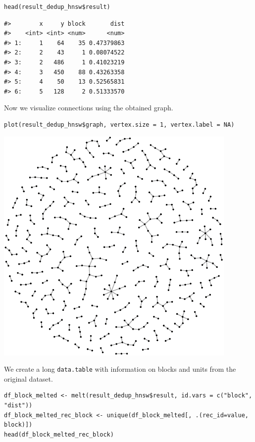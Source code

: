 \begin{verbatim}
head(result_dedup_hnsw$result)
\end{verbatim}

\begin{verbatim}
#>        x     y block       dist
#>    <int> <int> <num>      <num>
#> 1:     1    64    35 0.47379863
#> 2:     2    43     1 0.08074522
#> 3:     2   486     1 0.41023219
#> 4:     3   450    88 0.43263358
#> 5:     4    50    13 0.52565831
#> 6:     5   128     2 0.51333570
\end{verbatim}

Now we visualize connections using the obtained graph.

\begin{verbatim}
plot(result_dedup_hnsw$graph, vertex.size = 1, vertex.label = NA)
\end{verbatim}

\includegraphics[width=1\linewidth]{paper-blocking_files/figure-latex/dedup_graph-1}

We create a long \texttt{data.table} with information on blocks and units from the original dataset.

\begin{verbatim}
df_block_melted <- melt(result_dedup_hnsw$result, id.vars = c("block", "dist"))
df_block_melted_rec_block <- unique(df_block_melted[, .(rec_id=value, block)])
head(df_block_melted_rec_block)
\end{verbatim}

